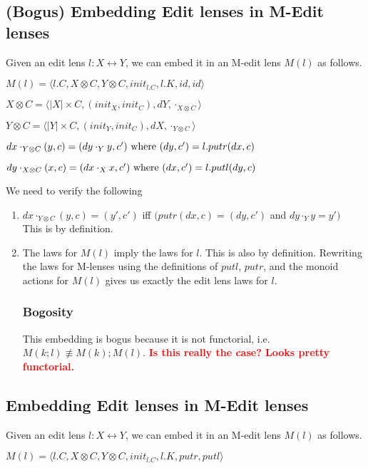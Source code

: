 \documentclass[a4paper,10pt]{article}
\newcommand{\finish}[1]{#1}
\newcommand{\comment}[1]{\finish{\textbf{\textcolor{red}{#1}}}}
\begin{document}
\subsection{(Bogus) Embedding Edit lenses in M-Edit lenses}
Given an edit lens $l:X \leftrightarrow Y$, we can embed it in an M-edit lens $M(l)$ as follows. 

$M(l) = \langle l.C, X \otimes C, Y \otimes C, init_{l.C}, l.K, id, id \rangle$

$X \otimes C = \langle |X| \times C, (init_X, init_C), dY, \cdot_{X \otimes C} \rangle$

$Y \otimes C = \langle |Y| \times C, (init_Y, init_C), dX, \cdot_{Y \otimes C} \rangle$

$ dx \cdot_{Y \otimes C} (y,c) = (dy \cdot_Y y, c') \textnormal{ where } (dy, c') = l.putr (dx, c)$

$ dy \cdot_{X \otimes C} (x,c) = (dx \cdot_X x, c') \textnormal{ where } (dx, c') = l.putl (dy, c)$

We need to verify the following
\begin{enumerate}
 \item $dx \cdot_{Y \otimes C} (y,c) = (y', c')$ iff $(putr (dx, c) = (dy, c')$ and $dy \cdot_Y y = y')$\\
       This is by definition.
 \item The laws for $M(l)$ imply the laws for $l$.
       This is also by definition. Rewriting the laws for M-lenses using the definitions of $putl$, $putr$, and the monoid actions for $M(l)$ gives us exactly the edit lens laws for $l$.
       
\subsubsection{Bogosity}
  This embedding is bogus because it is not functorial, i.e. $M(k;l) \not\equiv M(k);M(l)$. \comment{Is this really the case? Looks pretty functorial.} 
\end{enumerate}

\subsection{Embedding Edit lenses in M-Edit lenses}

Given an edit lens $l:X \leftrightarrow Y$, we can embed it in an M-edit lens $M(l)$ as follows. 

$M(l) = \langle l.C, X \otimes C, Y \otimes C, init_{l.C}, l.K, putr, putl \rangle$
\end{document}
